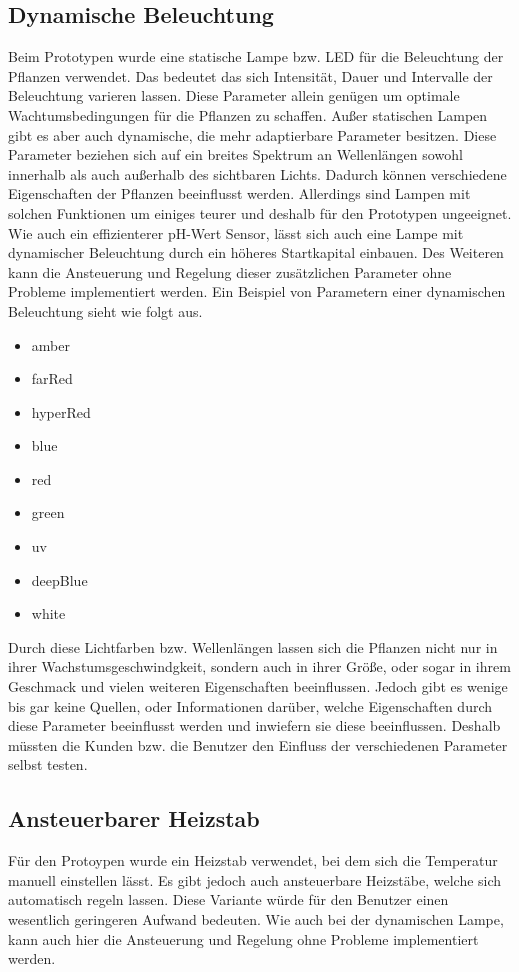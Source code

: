 \subsection{Dynamische Beleuchtung}
Beim Prototypen wurde eine statische Lampe bzw. LED für die Beleuchtung der Pflanzen verwendet. Das bedeutet das sich Intensität, Dauer und Intervalle der Beleuchtung varieren lassen. Diese Parameter allein genügen um optimale Wachtumsbedingungen für die Pflanzen zu schaffen. Außer statischen Lampen gibt es aber auch dynamische, die mehr adaptierbare Parameter besitzen. Diese Parameter beziehen sich auf ein breites Spektrum an Wellenlängen sowohl innerhalb als auch außerhalb des sichtbaren Lichts. Dadurch können verschiedene Eigenschaften der Pflanzen beeinflusst werden. Allerdings sind Lampen mit solchen Funktionen um einiges teurer und deshalb für den Prototypen ungeeignet.
\\
Wie auch ein effizienterer pH-Wert Sensor, lässt sich auch eine Lampe mit dynamischer Beleuchtung durch ein höheres Startkapital einbauen. Des Weiteren kann die Ansteuerung und Regelung dieser zusätzlichen Parameter ohne Probleme implementiert werden. Ein Beispiel von Parametern einer dynamischen Beleuchtung sieht wie folgt aus.

\begin{itemize}
    \item amber
    \item farRed
    \item hyperRed
    \item blue
    \item red
    \item green
    \item uv
    \item deepBlue
    \item white
\end{itemize}

Durch diese Lichtfarben bzw. Wellenlängen lassen sich die Pflanzen nicht nur in ihrer Wachstumsgeschwindgkeit, sondern auch in ihrer Größe, oder sogar in ihrem Geschmack und vielen weiteren Eigenschaften beeinflussen. Jedoch gibt es wenige bis gar keine Quellen, oder Informationen darüber, welche Eigenschaften durch diese Parameter beeinflusst werden und inwiefern sie diese beeinflussen. Deshalb müssten die Kunden bzw. die Benutzer den Einfluss der verschiedenen Parameter selbst testen.

\newpage
\subsection{Ansteuerbarer Heizstab}
Für den Protoypen wurde ein Heizstab verwendet, bei dem sich die Temperatur manuell einstellen lässt. Es gibt jedoch auch ansteuerbare Heizstäbe, welche sich automatisch regeln lassen. Diese Variante würde für den Benutzer einen wesentlich geringeren Aufwand bedeuten. Wie auch bei der dynamischen Lampe, kann auch hier die Ansteuerung und Regelung ohne Probleme implementiert werden.

